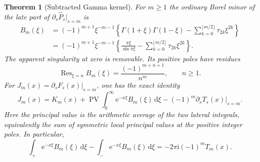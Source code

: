 \documentclass[11pt,a4paper]{article}
\newtheorem{theorem}{Theorem}[section]
\theoremstyle{definition}\newtheorem{definition}[theorem]{Definition}
\theoremstyle{remark}\newtheorem{remark}[theorem]{Remark}
\newcommand{\PV}{\operatorname{PV}}
\newcommand{\Res}{\operatorname{Res}}
\newcommand{\dd}{\,\mathrm d}
\newcommand{\ii}{\mathrm i}
\newcommand{\ee}{\mathrm e}
\numberwithin{equation}{section}
\begin{document}
\begin{theorem}[Subtracted Gamma kernel]\label{thm:Gamma-kernel}
For $m\ge1$ the ordinary Borel minor of the late part of
$\partial_s\widehat P_s|_{s=m}$ is
\begin{align}
 B_m(\xi)
 &=(-1)^{m+1}\xi^{-m-1}
   \left\{\Gamma(1+\xi)\Gamma(1-\xi)
           -\sum_{k=0}^{\lfloor m/2\rfloor}\tau_{2k}\xi^{2k}\right\}
       \label{eq:Gamma-kernel}\\
 &=(-1)^{m+1}\xi^{-m-1}
   \left\{\frac{\pi\xi}{\sin\pi\xi}
           -\sum_{k=0}^{\lfloor m/2\rfloor}\tau_{2k}\xi^{2k}\right\}.
       \label{eq:csc-kernel}
\end{align}
The apparent singularity at zero is removable. Its positive poles have
residues
\begin{equation}\label{eq:residues}
 \Res_{\xi=n}B_m(\xi)=\frac{(-1)^{m+n+1}}{n^m},\qquad n\ge1.
\end{equation}
For $J_m(x)=\partial_sF_s(x)|_{s=m}$, one has the exact identity
\begin{equation}\label{eq:jet-PV}
 J_m(x)=K_m(x)+\PV\int_0^\infty\ee^{-x\xi}B_m(\xi)\dd\xi
                   -(-1)^m\left.\partial_sT_s(x)\right|_{s=m}.
\end{equation}
Here the principal value is the arithmetic average of the two lateral
integrals, equivalently the sum of symmetric local principal values at the
positive integer poles. In particular,
\begin{equation}\label{eq:jet-jump}
 \int_+\ee^{-x\xi}B_m(\xi)\dd\xi
 -\int_-\ee^{-x\xi}B_m(\xi)\dd\xi
 =-2\pi\ii(-1)^mT_m(x).
\end{equation}
\end{theorem}
\end{document}
